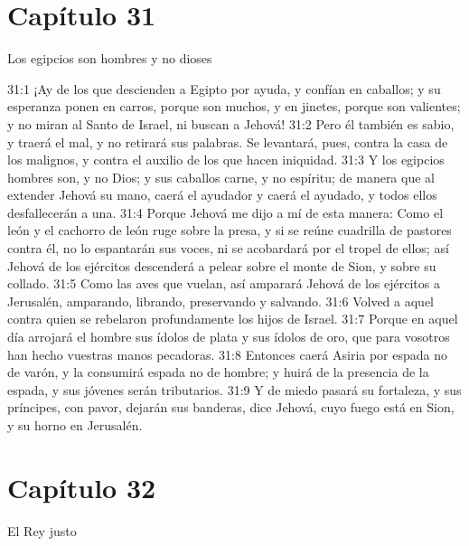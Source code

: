 \section*{Capítulo 31 }
Los egipcios son hombres y no dioses 
 
31:1 ¡Ay de los que descienden a Egipto por ayuda, y confían en caballos; y su esperanza ponen en carros, porque son muchos, y en jinetes, porque son valientes; y no miran al Santo de Israel, ni buscan a Jehová! 
31:2 Pero él también es sabio, y traerá el mal, y no retirará sus palabras. Se levantará, pues, contra la casa de los malignos, y contra el auxilio de los que hacen iniquidad. 
31:3 Y los egipcios hombres son, y no Dios; y sus caballos carne, y no espíritu; de manera que al extender Jehová su mano, caerá el ayudador y caerá el ayudado, y todos ellos desfallecerán a una. 
31:4 Porque Jehová me dijo a mí de esta manera: Como el león y el cachorro de león ruge sobre la presa, y si se reúne cuadrilla de pastores contra él, no lo espantarán sus voces, ni se acobardará por el tropel de ellos; así Jehová de los ejércitos descenderá a pelear sobre el monte de Sion, y sobre su collado. 
31:5 Como las aves que vuelan, así amparará Jehová de los ejércitos a Jerusalén, amparando, librando, preservando y salvando. 
31:6 Volved a aquel contra quien se rebelaron profundamente los hijos de Israel. 
31:7 Porque en aquel día arrojará el hombre sus ídolos de plata y sus ídolos de oro, que para vosotros han hecho vuestras manos pecadoras. 
31:8 Entonces caerá Asiria por espada no de varón, y la consumirá espada no de hombre; y huirá de la presencia de la espada, y sus jóvenes serán tributarios. 
31:9 Y de miedo pasará su fortaleza, y sus príncipes, con pavor, dejarán sus banderas, dice Jehová, cuyo fuego está en Sion, y su horno en Jerusalén. 
\section*{Capítulo 32 }
El Rey justo 
 
